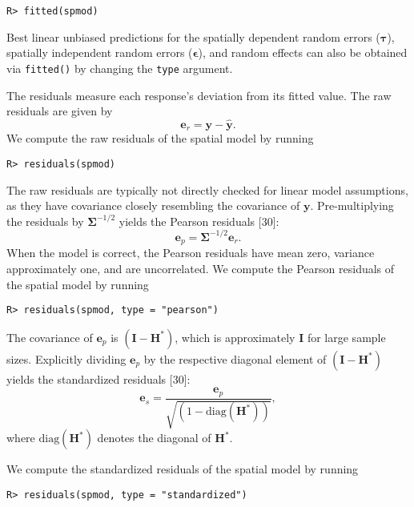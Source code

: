 \documentclass[10pt,letterpaper]{article}
\begin{document}
\begin{verbatim}
R> fitted(spmod)
\end{verbatim}

Best linear unbiased predictions for the spatially dependent random
errors (\(\boldsymbol{\tau}\)), spatially independent random errors
(\(\boldsymbol{\epsilon}\)), and random effects can also be obtained via
\texttt{fitted()} by changing the \texttt{type} argument.

The residuals measure each response's deviation from its fitted value.
The raw residuals are given by \begin{equation*}
  \mathbf{e}_{r} = \mathbf{y} - \hat{\mathbf{y}}.
\end{equation*} We compute the raw residuals of the spatial model by
running

\begin{verbatim}
R> residuals(spmod)
\end{verbatim}

The raw residuals are typically not directly checked for linear model
assumptions, as they have covariance closely resembling the covariance
of \(\mathbf{y}\). Pre-multiplying the residuals by
\(\boldsymbol{\Sigma}^{-1/2}\) yields the Pearson residuals {[}30{]}:
\begin{equation*}
  \mathbf{e}_{p} = \boldsymbol{\Sigma}^{-1/2}\mathbf{e}_{r}.
\end{equation*} When the model is correct, the Pearson residuals have
mean zero, variance approximately one, and are uncorrelated. We compute
the Pearson residuals of the spatial model by running

\begin{verbatim}
R> residuals(spmod, type = "pearson")
\end{verbatim}

The covariance of \(\mathbf{e}_{p}\) is \((\mathbf{I} - \mathbf{H}^*)\),
which is approximately \(\mathbf{I}\) for large sample sizes. Explicitly
dividing \(\mathbf{e}_{p}\) by the respective diagonal element of
\((\mathbf{I} - \mathbf{H}^*)\) yields the standardized residuals
{[}30{]}: \begin{equation*}
  \mathbf{e}_{s} = \frac{\mathbf{e}_{p}}{\sqrt{(1 - \text{diag}(\mathbf{H}^*))}},
\end{equation*} where \(\text{diag}(\mathbf{H}^*)\) denotes the diagonal
of \(\mathbf{H}^*\).

We compute the standardized residuals of the spatial model by running

\begin{verbatim}
R> residuals(spmod, type = "standardized")
\end{verbatim}
\end{document}
